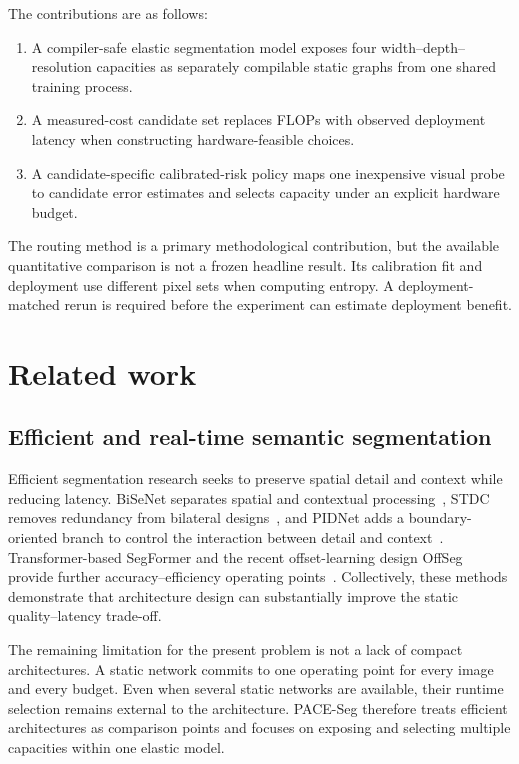 \documentclass[a4paper,review,12pt]{elsarticle}
\newcommand{\method}{PACE-Seg}
\begin{document}
The contributions are as follows:
\begin{enumerate}
    \item A compiler-safe elastic segmentation model exposes four width--depth--resolution capacities as separately compilable static graphs from one shared training process.
    \item A measured-cost candidate set replaces FLOPs with observed deployment latency when constructing hardware-feasible choices.
    \item A candidate-specific calibrated-risk policy maps one inexpensive visual probe to candidate error estimates and selects capacity under an explicit hardware budget.
\end{enumerate}

The routing method is a primary methodological contribution, but the available quantitative comparison is not a frozen headline result. Its calibration fit and deployment use different pixel sets when computing entropy. A deployment-matched rerun is required before the experiment can estimate deployment benefit.

\section{Related work}
\label{sec:related}

\subsection{Efficient and real-time semantic segmentation}

Efficient segmentation research seeks to preserve spatial detail and context while reducing latency. BiSeNet separates spatial and contextual processing~\cite{yu2018bisenet}, STDC removes redundancy from bilateral designs~\cite{fan2021stdc}, and PIDNet adds a boundary-oriented branch to control the interaction between detail and context~\cite{xu2023pidnet}. Transformer-based SegFormer and the recent offset-learning design OffSeg provide further accuracy--efficiency operating points~\cite{xie2021segformer,zhang2025offseg}. Collectively, these methods demonstrate that architecture design can substantially improve the static quality--latency trade-off.

The remaining limitation for the present problem is not a lack of compact architectures. A static network commits to one operating point for every image and every budget. Even when several static networks are available, their runtime selection remains external to the architecture. \method{} therefore treats efficient architectures as comparison points and focuses on exposing and selecting multiple capacities within one elastic model.
\end{document}
